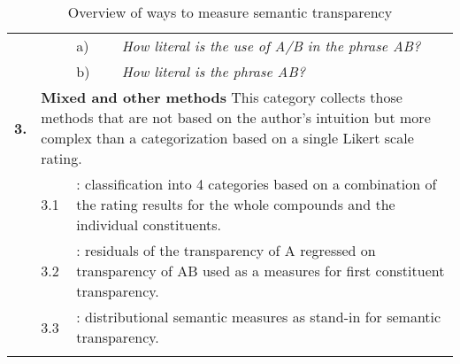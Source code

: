 \begin{table}[h]
\begin{tabular}{lp{.6cm}lp{10.3cm}}
&&a)&\multicolumn{1}{p{9cm}}{\emph{How literal is the use of A/B in the phrase AB?}}\\
&&b)&\multicolumn{1}{p{9cm}}{\emph{How literal is the phrase AB?}}\\\tablevspace %
\textbf{3.}&\multicolumn{3}{p{10.9cm}}{\textbf{Mixed and other methods}\newline
This category collects those methods that are not based on the
author's intuition but more complex than a categorization based on a single Likert scale rating.}\\%
&3.1&\multicolumn{2}{p{10cm}}{\citet{Libbenetal:2003}: classification into 4 categories based on
    a combination of the rating results for the whole compounds and the
    individual constituents.}\\%
&3.2&\multicolumn{2}{p{10cm}}{\citet[648]{MarelliandLuzzatti:2012}: residuals of the transparency of
    A regressed on transparency of AB used as a measures for first constituent transparency.}  \\%
&3.3&\multicolumn{2}{p{10cm}}{\citet{Marellietal:2014}: distributional semantic measures as stand-in
for semantic transparency.} \\
\lspbottomrule

\end{tabular}

  \caption{Overview of ways to measure semantic transparency}
  \label{tab:STmeasures}
  
\end{table}


